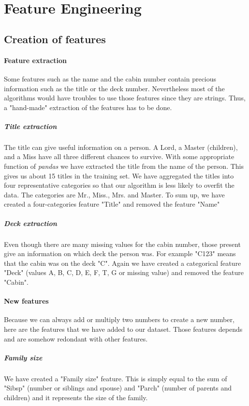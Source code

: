 \documentclass[11pt,a4paper,portrait]{article}
\begin{document}
\section{Feature Engineering}

\subsection{Creation of features}

\paragraph{Feature extraction}
Some features such as the name and the cabin number contain precious information such as the title or the deck number. Nevertheless most of the algorithms would have troubles to use those features since they are strings. Thus, a "hand-made" extraction of the features has to be done.

\subparagraph{Title extraction}
The title can give useful information on a person. A Lord, a Master (children), and a Miss have all three different chances to survive. With some appropriate function of \textit{pandas} we have extracted the title from the name of the person. This gives us about 15 titles in the training set. We have aggregated the titles into four representative categories so that our algorithm is less likely to overfit the data. The categories are Mr., Miss., Mrs. and Master. To sum up, we have created a four-categories feature "Title" and removed the feature "Name"


\subparagraph{Deck extraction}
Even though there are many missing values for the cabin number, those present give an information on which deck the person was. For example "C123" means that the cabin was on the deck "C". Again we have created a categorical feature "Deck" (values A, B, C, D, E, F, T, G or missing value) and removed the feature "Cabin".

\paragraph{New features}
Because we can always add or multiply two numbers to create a new number, here are the features that we have added to our dataset. Those features depends and are somehow redondant with other features.

\subparagraph{Family size}
We have created a "Family size" feature. This is simply equal to the sum of "Sibsp" (number or siblings and spouse) and "Parch" (number of parents and children) and it represents the size of the family.
\end{document}
